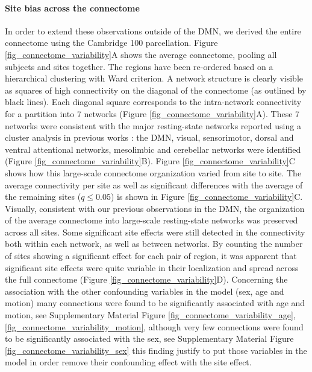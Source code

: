 \documentclass[authoryear]{elsarticle}
\begin{document}
\paragraph{Site bias across the connectome} In order to extend these
observations outside of the DMN, we derived the entire connectome using the
Cambridge 100 parcellation. Figure \ref{fig_connectome_variability}A shows the
average connectome, pooling all subjects and sites together. The regions have
been re-ordered based on a hierarchical clustering with Ward criterion. A
network structure is clearly visible as squares of high connectivity on the
diagonal of the connectome (as outlined by black lines). Each diagonal square
corresponds to the intra-network connectivity for a partition into 7 networks (Figure \ref{fig_connectome_variability}A). These 7 networks were
consistent with the major resting-state networks reported using a cluster
analysis in previous works \citep[e.g.][]{Heuvel2008, Bellec2010, Yeo2011,
Power2011}: the DMN, visual, sensorimotor, dorsal and ventral attentional
networks, mesolimbic and cerebellar networks were
identified (Figure \ref{fig_connectome_variability}B). Figure \ref{fig_connectome_variability}C shows how this large-scale
connectome organization varied from site to site. The average connectivity per
site as well as significant differences with the average of the remaining sites
($q\leq 0.05$) is shown in Figure \ref{fig_connectome_variability}C.
Visually, consistent with our previous observations in the DMN, the organization
of the average connectome into large-scale resting-state networks was preserved
across all sites. 
Some significant site effects were still detected in the connectivity both within each network, as well as between networks. By counting the number of sites showing a significant effect for each pair of region, it was apparent that significant site effects were quite variable in their localization and spread across the full connectome (Figure \ref{fig_connectome_variability}D). 
Concerning the association with the other confounding variables in the model (sex, age and motion) many connections were found to be significantly associated with age and motion, see Supplementary Material Figure \ref{fig_connectome_variability_age},\ref{fig_connectome_variability_motion}, although very few connections were found to be significantly associated with the sex, see Supplementary Material Figure \ref{fig_connectome_variability_sex} this finding justify to put those variables in the model in order remove their confounding effect with the site effect.
\end{document}
